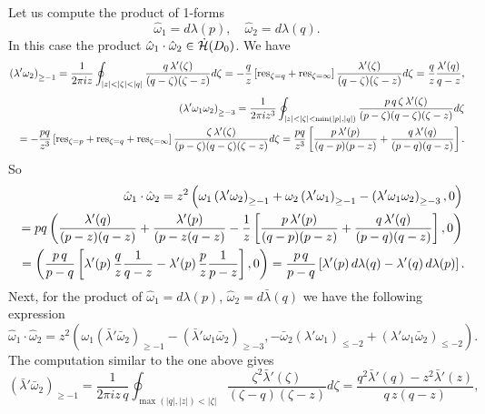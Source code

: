 \documentclass[numbook, envcountsame, envcountreset]{svjour3}
\begin{document}
{} Let us compute the product of 1-forms
$$
\hat\omega_1=d\lambda(p), \quad \hat\omega_2=d\lambda(q).
$$
In this case the product $\hat\omega_1\cdot \hat\omega_2\in \dot{\cal H}(D_0)$. We have
$$
\left( \lambda' \omega_2\right)_{\geq -1} =\frac1{2\pi i z} \oint_{|z|<|\zeta|<|q|} \frac{q\,\lambda'(\zeta)}{(q-\zeta) (\zeta-z)} d\zeta =-\frac{q}{z} \left[ {{\rm res}}_{\zeta=q} +{{\rm res}}_{\zeta=\infty}\right] \frac{\lambda'(\zeta)}{(q-\zeta) (\zeta-z)} d\zeta =\frac{q}{z} \frac{\lambda'(q)}{q-z},
$$
\begin{eqnarray}
&&
\left( \lambda'\omega_1 \omega_2\right)_{\geq -3} =\frac1{2\pi i z^3} \oint_{|z|<|\zeta|<\min (|p|, |q|)} \frac{p\, q\, \zeta\, \lambda'(\zeta)}{(p-\zeta)(q-\zeta)(\zeta-z)} d\zeta
{\nonumber}\\
&&
=-\frac{pq}{z^3}\left[ {{\rm res}}_{\zeta=p}+{{\rm res}}_{\zeta=q} +{{\rm res}}_{\zeta=\infty}\right]\frac{\zeta\, \lambda'(\zeta)}{(p-\zeta)(q-\zeta)(\zeta-z)} d\zeta
=\frac{pq}{z^3}\left[ \frac{p\, \lambda'(p)}{(q-p)(p-z)} +\frac{q\, \lambda'(q)}{(p-q)(q-z)}\right].
{\nonumber}
\end{eqnarray}
So
\begin{eqnarray}
&&
\hat\omega_1\cdot \hat\omega_2 =z^2 \left( \omega_1 \left(\lambda'\omega_2\right)_{\geq -1} +  \omega_2 \left(\lambda'\omega_1\right)_{\geq -1} -\left( \lambda' \omega_1 \omega_2\right)_{\geq -3}, 0\right) 
{\nonumber}\\
&&
=
pq \left( \frac{\lambda'(q)}{(p-z)(q-z)} +\frac{\lambda'(p)}{(p-z(q-z)} -\frac1{z}\left[ \frac{p\,\lambda'(p)}{(q-p)(p-z)} +\frac{q\, \lambda'(q)}{(p-q)(q-z)}\right], 0\right)
{\nonumber}\\
&&
=\left( \frac{p\, q}{p-q} \left[ \lambda'(p) \, \frac{q}{z} \frac1{q-z} -\lambda'(p)\, \frac{p}{z} \frac1{p-z}\right], 0\right)= \frac{p\, q}{p-q}\left[ \lambda'(p)\, d\lambda(q) -\lambda'(q)\, d\lambda(p)\right].
{\nonumber}
\end{eqnarray}
Next, for the product of $\hat\omega_1=d\lambda(p)$, $\hat\omega_2=d\bar\lambda(q)$ we have the following expression
$$
\hat\omega_1\cdot\hat\omega_2=z^2\left( \omega_1 \left(\bar\lambda'\bar\omega_2\right)_{\geq -1} -\left( \bar\lambda'\omega_1 \bar\omega_2\right)_{\geq -3}, -\bar\omega_2 \left( \lambda' \omega_1\right)_{\leq -2} +\left( \lambda'\omega_1 \bar\omega_2\right)_{\leq -2}\right).
$$
The computation similar to the one above gives
$$
\left( \bar\lambda'\bar\omega_2\right)_{\geq -1} =\frac1{2\pi i z\, q} \oint_{\max(|q|, |z|)<|\zeta|}  \frac{\zeta^2\bar\lambda'(\zeta)}{(\zeta-q)(\zeta-z)} d\zeta =\frac{q^2 \bar\lambda'(q) - z^2 \bar\lambda'(z)}{q\, z (q-z)},
$$
\end{document}
